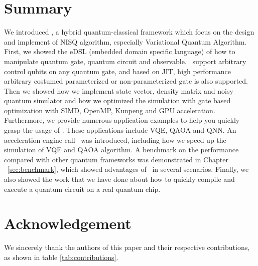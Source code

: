 \documentclass[pra,twocolumn,superscriptaddress,floatfix,nofootinbib,amsmath,amssymb]{revtex4-1}
\numberwithin{equation}{section}
\numberwithin{figure}{section}
\numberwithin{table}{section}
\begin{document}
\section{Summary}
\label{sec:summary}
We introduced \MindQuantum, a hybrid quantum-classical framework which focus on the design and implement of NISQ algorithm, especially Variational Quantum Algorithm. First, we showed the eDSL (embedded domain specific language) of how to manipulate quantum gate, quantum circuit and observable. \MindQuantum\ support arbitrary control qubits on any quantum gate, and based on JIT, high performance arbitrary costumed parameterized or non-parameterized gate is also supported. Then we showed how we implement state vector, density matrix and noisy quantum simulator and how we optimized the simulation with gate based optimization with SIMD, OpenMP, Kunpeng and GPU acceleration. Furthermore, we provide numerous application examples to help you quickly grasp the usage of \MindQuantum. These applications include VQE, QAOA and QNN. An acceleration engine call \QuPack\ was introduced, including how we speed up the simulation of VQE and QAOA algorithm. A benchmark on the performance compared with other quantum frameworks was demonstrated in Chapter ~\ref{sec:benchmark}, which showed advantages of \MindQuantum\ in several scenarios. Finally, we also showed the work that we have done about how to quickly compile and execute a quantum circuit on a real quantum chip.

\section{Acknowledgement}
\label{sec:acknowledgement}
We sincerely thank the authors of this paper and their respective contributions, as shown in table \ref{tab:contributions}.
\end{document}

